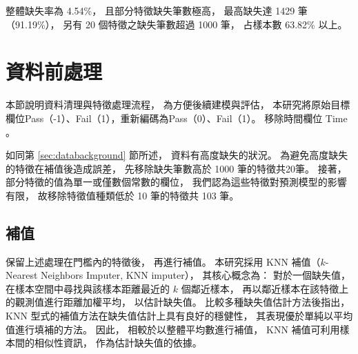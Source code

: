 \documentclass[12pt,a4paper,oneside]{book}
\begin{document}
	整體缺失率為 4.54\%，
	且部分特徵缺失筆數極高，
	最高缺失達 1429 筆（91.19\%），
	另有 20 個特徵之缺失筆數超過 1000 筆，
	占樣本數 63.82\% 以上。

	\section{資料前處理}
	\label{sec:資料處理}
	本節說明資料清理與特徵處理流程，
	為方便後續建模與評估，
	本研究將原始目標欄位Pass（-1）、Fail（1），重新編碼為Pass（0）、Fail（1）。
	移除時間欄位 Time 。

	如同第 \ref{sec:databackground} 節所述，
	資料有高度缺失的狀況。
	為避免高度缺失的特徵在補值後造成誤差，
	先移除缺失筆數高於 1000 筆的特徵共20筆。
	接著，
	部分特徵的值為單一或僅數個常數的欄位，
	我們認為這些特徵對預測模型的影響有限，
	故移除特徵值種類低於 10 筆的特徵共 103 筆。




	\subsection{補值}
	保留上述處理在門檻內的特徵後，
	再進行補值。
	本研究採用 KNN 補值（$k$-Nearest Neighbors Imputer, KNN imputer），
	其核心概念為：
	對於一個缺失值，
	在樣本空間中尋找與該樣本距離最近的 $k$ 個鄰近樣本，
	再以鄰近樣本在該特徵上的觀測值進行距離加權平均，
	以估計缺失值。
	\cite{Troyanskaya}比較多種缺失值估計方法後指出，
	KNN 型式的補值方法在缺失值估計上具有良好的穩健性，
	其表現優於單純以平均值進行填補的方法。
	因此，
	相較於以整體平均數進行補值，
	KNN 補值可利用樣本間的相似性資訊，
	作為估計缺失值的依據。
\end{document}
